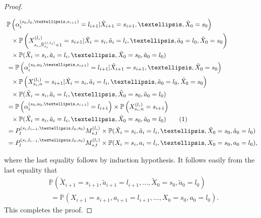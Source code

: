 \documentclass[opre,sglanonrev]{informs4}
\numberwithin{equation}{section}
\newcommand{\pow}[1]{^{(#1)}}
\newcommand{\lp}{\left(}
\newcommand{\rp}{\right)}
\newcommand{\Pbb}{\mathbb{P}}
\newcommand\numberthis{\addtocounter{equation}{1}\tag{\theequation}}
\newcommand{\prob}{\Pbb}
\begin{document}
\begin{APPENDICES}
\begin{proof}
\begin{small}
\begin{align*}
    & \ \prob\lp  \alpha_i\pow{s_0,l_0,\dots,s_{i+1}}=l_{i+1}| \tilde X_{i+1}=s_{i+1},\dots,\tilde X_0=s_0\rp\\
    &\quad \times \prob\lp X_{s_i,\Tilde{N}_{s_i}^{(i,l_i)}+1}\pow{l_i}=s_{i+1}|\tilde X_i=s_i,\tilde a_{i}=l_i,\dots,\tilde a_0=l_0,\tilde X_0=s_0\rp\\
    &\quad \times \prob(\tilde X_i=s_i,\tilde a_i=l_i,\dots,\tilde X_0=s_0,\tilde a_0=l_0)\\
    &  \ =\prob\lp \alpha_i\pow{s_0,a_0,\dots,s_{i+1}}=l_{i+1}| \tilde X_{i+1}=s_{i+1},\dots,\tilde X_0=s_0\rp\\
    &\quad \times \prob\lp X_{s_i,n}\pow{l_i}=s_{i+1}|\tilde X_i=s_i,\tilde a_{i}=l_i,\dots,\tilde a_0=l_0,\tilde X_0=s_0\rp\\
    &\quad \times \prob(\tilde X_i=s_i,\tilde a_i=l_i,\dots,\tilde X_0=s_0,\tilde a_0=l_0)\\
    &  \ =\prob\lp \alpha_i\pow{s_0,a_0,\dots,s_{i+1}}=l_{i+1}\rp\times \prob\lp X_{s_i,n}\pow{l_i}=s_{i+1}\rp\\
    &\quad \times \prob(\tilde X_i=s_i,\tilde a_i=l_i,\dots,\tilde X_0=s_0,\tilde a_0=l_0)\numberthis\\
    &\ = P_l\pow{s_i,l_{i-1},\dots,l_0,s_0} M_{s,t}\pow{l_i} \times \prob(\tilde X_i=s_i,\tilde a_i=l_i,\dots,\tilde X_0=s_0,\tilde a_0=l_0)\\
    &\ = P_l\pow{s_i,l_{i-1},\dots,l_0,s_0} M_{s,t}\pow{l_i} \times \prob(X_i=s_i, a_i=l_i,\dots,X_0=s_0, a_0=l_0),
\end{align*}
\end{small}
where the last equality follows by induction hypothesis. It follows easily from the last equality that 
\begin{align*}
   &\prob\lp \tilde X_{i+1}=s_{i+1},\tilde a_{i+1}=l_{i+1},\dots,\tilde X_0=s_0,\tilde a_0=l_0 \rp \\ 
   &\ = \prob\lp  X_{i+1}=s_{i+1}, a_{i+1}=l_{i+1},\dots, X_0=s_0, a_0=l_0 \rp. 
\end{align*}
This completes the proof.
\end{proof}


\end{APPENDICES}
\end{document}
